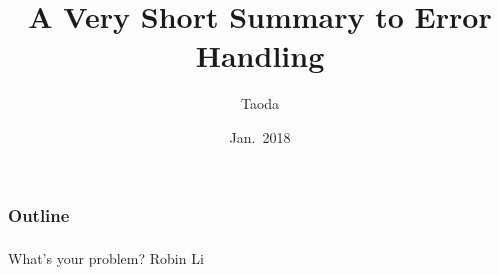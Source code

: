 \documentclass[lualatex]{beamer}
\title[Errors]{A Very Short Summary to Error Handling}
\author{Taoda}
\institute{YITU tech}
\date{Jan.\ 2018}
\begin{document}
\begin{frame}
\titlepage
\end{frame}

\begin{frame}
  \frametitle{Outline}
  \tableofcontents
\end{frame}

\begin{frame}
  \frametitle{}
  \begin{center}
    \Huge
    What's your problem?
    \flushright Robin Li
  \end{center}
\end{frame}
\end{document}

